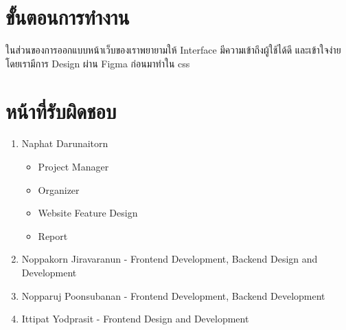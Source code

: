 \documentclass[17pt]{extarticle}
\begin{document}
\section{ขั้นตอนการทำงาน}
ในส่วนของการออกแบบหน้าเว็บของเราพยายามให้ Interface มีความเข้าถึงผู้ใช้ได้ดี และเข้าใจง่าย โดยเรามีการ Design ผ่าน Figma ก่อนมาทำใน css
\pagebreak
\section{หน้าที่รับผิดชอบ}
\begin{enumerate}
    \item Naphat Darunaitorn
          \begin{itemize}
              \item Project Manager
              \item Organizer
              \item Website Feature Design
              \item Report
          \end{itemize}
    \item Noppakorn Jiravaranun - Frontend Development, Backend Design and Development
    \item Nopparuj Poonsubanan - Frontend Development, Backend Development
    \item Ittipat Yodprasit - Frontend Design and Development
\end{enumerate}
\end{document}
